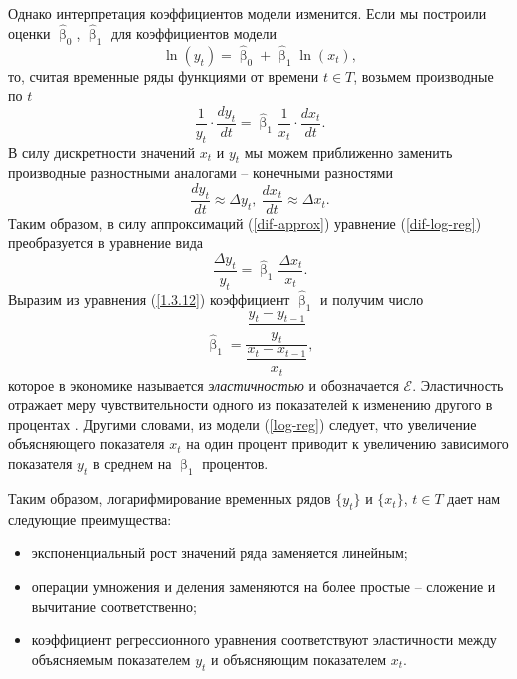 \documentclass[a4paper, 14pt]{extreport}
\numberwithin{equation}{section}
\renewcommand{\beta}{\upbeta}
\numberwithin{equation}{section}
\begin{document}
	Однако интерпретация коэффициентов модели изменится. Если мы построили оценки $\hat \beta_0$, $\hat \beta_1$ для коэффициентов модели
	\begin{equation}\label{log-reg}
		\ln (y_t) = \hat \beta_0 + \hat \beta_1 \ln (x_t),
	\end{equation}
	то, считая временные ряды функциями от времени $t \in T$, возьмем производные по $t$
	\begin{equation}\label{dif-log-reg}
		\dfrac{1}{y_t}\cdot \dfrac{d y_t}{d t} = \hat \beta_1 \dfrac{1}{x_t}\cdot \dfrac{d x_t}{dt}.
	\end{equation}
	В силу дискретности значений $x_t$ и $y_t$ мы можем приближенно заменить производные разностными аналогами -- конечными разностями
	\begin{equation}\label{dif-approx}
		 \dfrac{d y_t}{d t} \approx \Delta y_t,\  \dfrac{d x_t}{d t} \approx \Delta x_t.
	\end{equation}
	Таким образом, в силу аппроксимаций (\ref{dif-approx}) уравнение (\ref{dif-log-reg}) преобразуется в уравнение вида
	\begin{equation}\label{1.3.12}
		\dfrac{\Delta y_t}{y_t} = \hat \beta_1 \dfrac{\Delta x_t}{x_t}.
	\end{equation}
	Выразим из уравнения (\ref{1.3.12}) коэффициент $\hat \beta_1$ и получим число
	\begin{equation}
		\hat \beta_1 = \dfrac{\dfrac{y_t - y_{t-1}}{y_t}}{\dfrac{x_t - x_{t-1}}{x_t}},
	\end{equation}
	которое в экономике называется \textit{эластичностью} и обозначается $\mathcal E$. Эластичность отражает меру чувствительности одного из показателей к изменению другого в процентах \cite{4}. Другими словами, из модели (\ref{log-reg}) следует, что увеличение объясняющего показателя $x_t$ на один процент приводит к увеличению зависимого показателя $y_t$ в среднем на $\hat\beta_1$ процентов.
	
	Таким образом, логарифмирование временных рядов $\{y_t\}$ и $\{x_t\}$, $t \in T$ дает нам следующие преимущества:
	\begin{itemize}
		\item экспоненциальный рост значений ряда заменяется линейным;
		\item операции умножения и деления заменяются на более простые -- сложение и вычитание соответственно;
		\item коэффициент регрессионного уравнения соответствуют эластичности между объясняемым показателем $y_t$ и объясняющим показателем $x_t$.
	\end{itemize}
	
\end{document}
